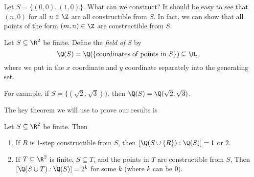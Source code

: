 \documentclass[a4paper]{article}
\begin{document}
\begin{eg}
  Let $S = \{(0, 0), (1, 0)\}$. What can we construct? It should be easy to see that $(n, 0)$ for all $n \in \Z$ are all constructible from $S$. In fact, we can show that all points of the form $(m, n)\in \Z$ are constructible from $S$.
  \begin{center}
  \end{center}
\end{eg}

\begin{defi}[Field of $S$]
  Let $S\subseteq \R^2$ be finite. Define the \emph{field of} $S$ by
  \[
    \Q(S) = \Q(\{\text{coordinates of points in }S\}) \subseteq \R,
  \]
  where we put in the $x$ coordinate and $y$ coordinate separately into the generating set.
\end{defi}
For example, if $S = \{(\sqrt{2}, \sqrt{3})\}$, then $\Q(S) = \Q(\sqrt{2}, \sqrt{3})$.

The key theorem we will use to prove our results is
\begin{thm}[]
  Let $S\subseteq \R^2$ be finite. Then
  \begin{enumerate}
    \item If $R$ is 1-step constructible from $S$, then $[\Q(S\cup \{R\}):\Q(S)] = 1$ or $2$.
    \item If $T\subseteq \R^2$ is finite, $S\subseteq T$, and the points in $T$ are constructible from $S$, Then $[\Q(S\cup T): \Q(S)] = 2^k$ for some $k$ (where $k$ can be $0$).
  \end{enumerate}
\end{thm}
\end{document}
